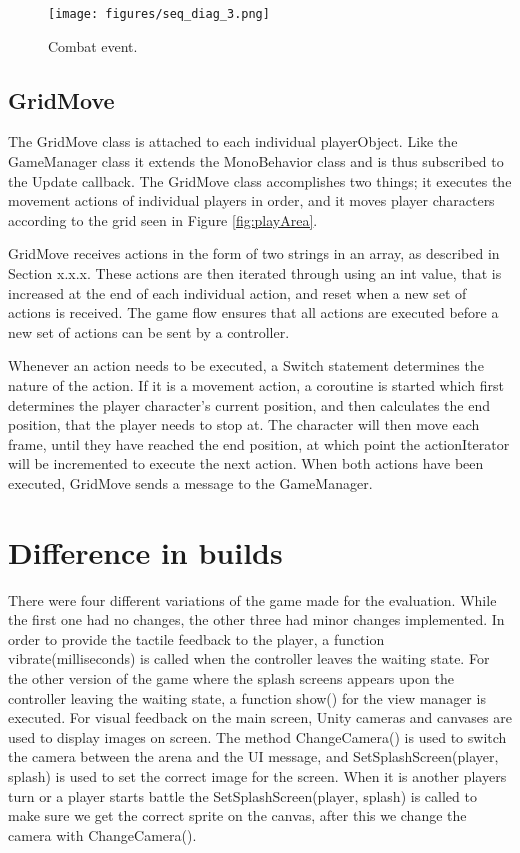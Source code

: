 \begin{figure}
	\centering
	\texttt{[image: figures/seq\_diag\_3.png]}
	\caption{Combat event. \label{fig:seqDiag3}}
\end{figure}

\subsection{GridMove}
The GridMove class is attached to each individual playerObject. Like the GameManager class it extends the MonoBehavior class and is thus subscribed to the Update callback. The GridMove class accomplishes two things; it executes the movement actions of individual players in order, and it moves player characters according to the grid seen in Figure \ref{fig:playArea}. 


GridMove receives actions in the form of two strings in an array, as described in Section x.x.x. These actions are then iterated through using an int value, that is increased at the end of each individual action, and reset when a new set of actions is received. The game flow ensures that all actions are executed before a new set of actions can be sent by a controller. 


Whenever an action needs to be executed, a Switch statement determines the nature of the action. If it is a movement action, a coroutine is started which first determines the player character’s current position, and then calculates the end position, that the player needs to stop at. The character will then move each frame, until they have reached the end position, at which point the actionIterator will be incremented to execute the next action. When both actions have been executed, GridMove sends a message to the GameManager.

\section{Difference in builds}
There were four different variations of the game made for the evaluation. While the first one had no changes, the other three had minor changes implemented. In order to provide the tactile feedback to the player, a function vibrate(milliseconds) is called when the controller leaves the waiting state. For the other version of the game where the splash screens appears upon the controller leaving the waiting state, a function show() for the view manager is executed. For visual feedback on the main screen, Unity cameras and canvases are used to display images on screen. The method ChangeCamera() is used to switch the camera between the arena and the UI message, and  SetSplashScreen(player, splash) is used to set the correct image for the screen. When it is another players turn or a player starts battle the SetSplashScreen(player, splash) is called to make sure we get the correct sprite on the canvas, after this we change the camera with ChangeCamera(). 

